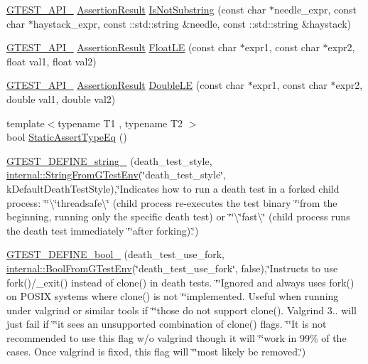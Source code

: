 \begin{DoxyCompactItemize}
\item 
\hyperlink{gtest-port_8h_aa73be6f0ba4a7456180a94904ce17790}{G\+T\+E\+S\+T\+\_\+\+A\+P\+I\+\_\+} \hyperlink{classtesting_1_1_assertion_result}{Assertion\+Result} \hyperlink{namespacetesting_abe7b3fa1c9528745f934d4a14155ea87}{Is\+Not\+Substring} (const char $\ast$needle\+\_\+expr, const char $\ast$haystack\+\_\+expr, const \+::std\+::string \&needle, const \+::std\+::string \&haystack)
\item 
\hyperlink{gtest-port_8h_aa73be6f0ba4a7456180a94904ce17790}{G\+T\+E\+S\+T\+\_\+\+A\+P\+I\+\_\+} \hyperlink{classtesting_1_1_assertion_result}{Assertion\+Result} \hyperlink{namespacetesting_a2c9a2a391c72a7b02ea3024586e33af0}{Float\+L\+E} (const char $\ast$expr1, const char $\ast$expr2, float val1, float val2)
\item 
\hyperlink{gtest-port_8h_aa73be6f0ba4a7456180a94904ce17790}{G\+T\+E\+S\+T\+\_\+\+A\+P\+I\+\_\+} \hyperlink{classtesting_1_1_assertion_result}{Assertion\+Result} \hyperlink{namespacetesting_ae10e2bb304b74abd1b06a2d912a8b43b}{Double\+L\+E} (const char $\ast$expr1, const char $\ast$expr2, double val1, double val2)
\item 
{\footnotesize template$<$typename T1 , typename T2 $>$ }\\bool \hyperlink{namespacetesting_a661e70fc6afeb5c085eed3716aa45059}{Static\+Assert\+Type\+Eq} ()
\item 
\hyperlink{namespacetesting_ad93c9ec89517d047ed323b79d96df251}{G\+T\+E\+S\+T\+\_\+\+D\+E\+F\+I\+N\+E\+\_\+string\+\_\+} (death\+\_\+test\+\_\+style, \hyperlink{namespacetesting_1_1internal_a7ed785df46a339403b0f749d3a879201}{internal\+::\+String\+From\+G\+Test\+Env}(\char`\"{}death\+\_\+test\+\_\+style\char`\"{}, k\+Default\+Death\+Test\+Style),\char`\"{}Indicates how to run a death test in a forked child process\+: \char`\"{}\char`\"{}\textbackslash{}\char`\"{}threadsafe\textbackslash{}\char`\"{} (child process re-\/executes the test binary \char`\"{}\char`\"{}from the beginning, running only the specific death test) or \char`\"{}\char`\"{}\textbackslash{}\char`\"{}fast\textbackslash{}\char`\"{} (child process runs the death test immediately \char`\"{}\char`\"{}after forking).\char`\"{})
\item 
\hyperlink{namespacetesting_afee59458b05682d57d3a389e0903bc01}{G\+T\+E\+S\+T\+\_\+\+D\+E\+F\+I\+N\+E\+\_\+bool\+\_\+} (death\+\_\+test\+\_\+use\+\_\+fork, \hyperlink{namespacetesting_1_1internal_a67132cdce23fb71b6c38ee34ef81eb4c}{internal\+::\+Bool\+From\+G\+Test\+Env}(\char`\"{}death\+\_\+test\+\_\+use\+\_\+fork\char`\"{}, false),\char`\"{}Instructs to use fork()/\+\_\+exit() instead of clone() in death tests. \char`\"{}\char`\"{}Ignored and always uses fork() on P\+O\+S\+I\+X systems where clone() is not \char`\"{}\char`\"{}implemented. Useful when running under valgrind or similar tools if \char`\"{}\char`\"{}those do not support clone(). Valgrind 3.. will just fail if \char`\"{}\char`\"{}it sees an unsupported combination of clone() flags. \char`\"{}\char`\"{}It is not recommended to use this flag w/o valgrind though it will \char`\"{}\char`\"{}work in 99\% of the cases. Once valgrind is fixed, this flag will \char`\"{}\char`\"{}most likely be removed.\char`\"{})

\end{DoxyCompactItemize}
